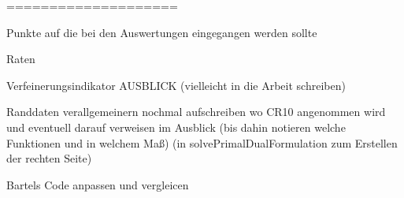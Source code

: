 ====================

Punkte auf die bei den Auswertungen eingegangen werden sollte

Raten

Verfeinerungsindikator
AUSBLICK (vielleicht in die Arbeit schreiben)
  
  Randdaten verallgemeinern
    nochmal aufschreiben wo CR10 angenommen wird und eventuell darauf verweisen 
    im Ausblick (bis dahin notieren welche Funktionen und in welchem Maß)
    (in solvePrimalDualFormulation zum Erstellen der rechten Seite)
    
  Bartels Code anpassen und vergleicen

